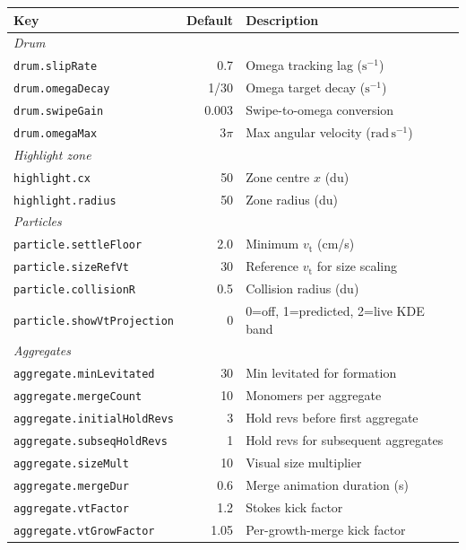 \documentclass[12pt, a4paper]{article}
\newcommand{\vt}{v_{\mathrm{t}}}
\begin{document}
\begin{longtable}{@{}lrl@{}}
  \toprule
  Key & Default & Description \\
  \midrule
  \multicolumn{3}{l}{\textit{Drum}} \\
  \texttt{drum.slipRate}         & 0.7      & Omega tracking lag ($\mathrm{s^{-1}}$) \\
  \texttt{drum.omegaDecay}       & 1/30     & Omega target decay ($\mathrm{s^{-1}}$) \\
  \texttt{drum.swipeGain}        & 0.003    & Swipe-to-omega conversion \\
  \texttt{drum.omegaMax}         & $3\pi$   & Max angular velocity ($\mathrm{rad\,s^{-1}}$) \\
  \midrule
  \multicolumn{3}{l}{\textit{Highlight zone}} \\
  \texttt{highlight.cx}          & 50       & Zone centre $x$ (du) \\
  \texttt{highlight.radius}      & 50       & Zone radius (du) \\
  \midrule
  \multicolumn{3}{l}{\textit{Particles}} \\
  \texttt{particle.settleFloor}  & 2.0      & Minimum $\vt$ (cm/s) \\
  \texttt{particle.sizeRefVt}    & 30       & Reference $\vt$ for size scaling \\
  \texttt{particle.collisionR}   & 0.5      & Collision radius (du) \\
  \texttt{particle.showVtProjection} & 0    & 0=off, 1=predicted, 2=live KDE band \\
  \midrule
  \multicolumn{3}{l}{\textit{Aggregates}} \\
  \texttt{aggregate.minLevitated}    & 30   & Min levitated for formation \\
  \texttt{aggregate.mergeCount}      & 10   & Monomers per aggregate \\
  \texttt{aggregate.initialHoldRevs} & 3    & Hold revs before first aggregate \\
  \texttt{aggregate.subseqHoldRevs}  & 1    & Hold revs for subsequent aggregates \\
  \texttt{aggregate.sizeMult}        & 10   & Visual size multiplier \\
  \texttt{aggregate.mergeDur}        & 0.6  & Merge animation duration (s) \\
  \texttt{aggregate.vtFactor}        & 1.2  & Stokes kick factor \\
  \texttt{aggregate.vtGrowFactor}    & 1.05 & Per-growth-merge kick factor \\

\end{longtable}
\end{document}
